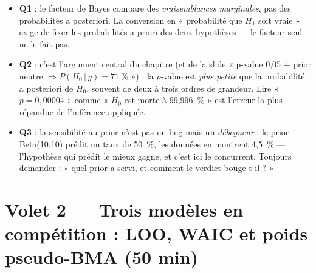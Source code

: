 \documentclass[11pt,a4paper]{article}
\newcommand{\given}{\,\vert\,}
\begin{document}
\begin{piege}[Questions 1 à 3]
\begin{itemize}[leftmargin=4mm, itemsep=0.5mm]
  \item \textbf{Q1} : le facteur de Bayes compare des \emph{vraisemblances
        marginales}, pas des probabilités a posteriori. La conversion en
        « probabilité que $H_1$ soit vraie » exige de fixer les probabilités
        a priori des deux hypothèses --- le facteur seul ne le fait pas.
  \item \textbf{Q2} : c'est l'argument central du chapitre (et de la slide
        « p-value 0,05 + prior neutre $\Rightarrow P(H_0 \given y) = 71~\%$ ») :
        la $p$-value est \emph{plus petite} que la probabilité a posteriori
        de $H_0$, souvent de deux à trois ordres de grandeur. Lire « $p =
        0{,}00004$ » comme « $H_0$ est morte à 99{,}996~\% » est l'erreur
        la plus répandue de l'inférence appliquée.
  \item \textbf{Q3} : la sensibilité au prior n'est pas un bug mais un
        \emph{débogueur} : le prior Beta(10,10) prédit un taux de 50~\%,
        les données en montrent 4,5~\% --- l'hypothèse qui prédit le mieux
        gagne, et c'est ici le concurrent. Toujours demander : « quel prior
        a servi, et comment le verdict bouge-t-il ? »
\end{itemize}
\end{piege}

\section{Volet 2 --- Trois modèles en compétition : LOO, WAIC et poids pseudo-BMA (50 min)}
\end{document}
